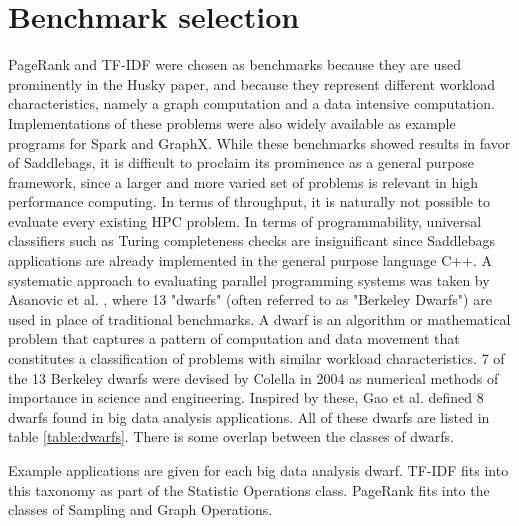 \documentclass{uit-report}
\begin{document}
\section{Benchmark selection}
PageRank and TF-IDF were chosen as benchmarks because they are used prominently in the Husky paper, and because they represent different workload characteristics, namely a graph computation and a data intensive computation. Implementations of these problems were also widely available as example programs for Spark and GraphX. While these benchmarks showed results in favor of Saddlebags, it is difficult to proclaim its prominence as a general purpose framework, since a larger and more varied set of problems is relevant in high performance computing. In terms of throughput, it is naturally not possible to evaluate every existing HPC problem. In terms of programmability, universal classifiers such as Turing completeness checks are insignificant since Saddlebags applications are already implemented in the general purpose language C++. 
\newpage
A systematic approach to evaluating parallel programming systems was taken by Asanovic et al. \cite{dwarfs}, where 13 "dwarfs" (often referred to as "Berkeley Dwarfs") are used in place of traditional benchmarks. A dwarf is an algorithm or mathematical problem that captures a pattern of computation and data movement that constitutes a classification of problems with similar workload characteristics. 7 of the 13 Berkeley dwarfs were devised by Colella \cite{colella} in 2004 as numerical methods of importance in science and engineering. Inspired by these, Gao et al. \cite{datadwarfs} defined 8 dwarfs found in big data analysis applications. All of these dwarfs are listed in table \ref{table:dwarfs}. There is some overlap between the classes of dwarfs.

Example applications are given for each big data analysis dwarf. TF-IDF fits into this taxonomy as part of the Statistic Operations class. PageRank fits into the classes of Sampling and Graph Operations.
\end{document}
